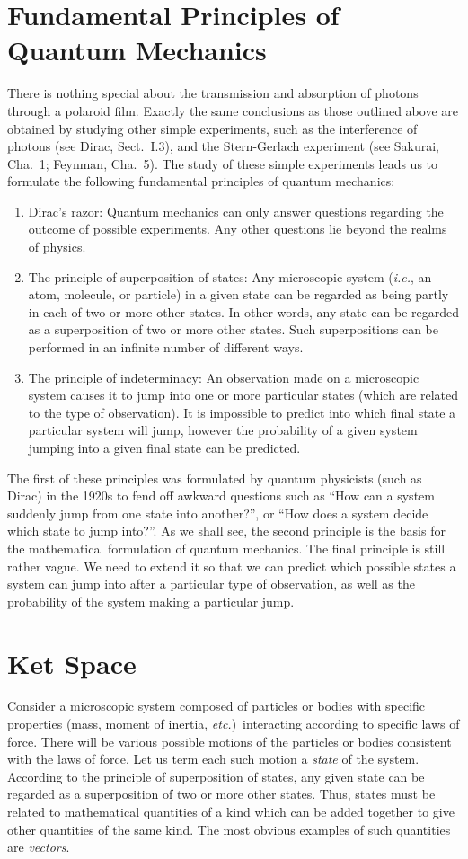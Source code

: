 \section{Fundamental Principles of Quantum Mechanics}
There is nothing special about the transmission and absorption of photons
through a polaroid film. Exactly the same conclusions as those outlined above
are obtained by studying other simple experiments, such as the interference of photons
(see Dirac, Sect.~I.3), and the Stern-Gerlach experiment (see Sakurai,  
Cha.~1; Feynman, Cha.~5). The study of
these simple experiments leads us to formulate the following fundamental principles of
quantum mechanics:
\begin{enumerate}
\item {\sf Dirac's razor:} Quantum mechanics can only answer questions regarding the
outcome of possible experiments. Any other questions lie beyond the realms of
physics.
\item {\sf The principle of superposition of states:} Any  microscopic
system ({\em i.e.}, an atom, molecule, or particle)  in a given state can be regarded
as being partly in each of two or more other states. In other words, any state
can be regarded as a superposition of two or more other states. Such superpositions can be performed in an infinite number
of different ways.
\item {\sf The principle of indeterminacy:} An observation made on a 
microscopic system causes it
to jump into one or more particular states (which are related to the type
of observation). It is impossible to predict into which final 
state a particular system
will jump, however the probability of a given  system jumping into a given final
state can be predicted. 
\end{enumerate}
The first of these principles was formulated by quantum physicists (such as Dirac)
in the 1920s
 to fend off awkward questions such as ``How can a system suddenly
jump from one state into another?'', 
or ``How does a system decide which state to
jump into?''. As we shall see, the second principle is
the basis for the mathematical formulation of quantum mechanics.
The final principle is still rather vague. We need to extend it 
so that we can predict which possible states  a system can jump into after
a particular type of observation, as well as the probability of
the system making a particular jump.

\section{Ket Space}
Consider a microscopic system composed of particles or bodies with
specific properties (mass, moment of inertia, {\em etc.})\ interacting according
to specific laws of force. There will be various possible motions of the
particles or bodies consistent with the laws of force. Let us term each such
motion a {\em state} of the system. According to the principle of superposition
of states, any given state can be regarded as a superposition of two or more other
states. Thus, states must be related to mathematical quantities of a kind which
can be added together to give other quantities of the same kind. The most
obvious examples of such quantities are {\em vectors}. 

